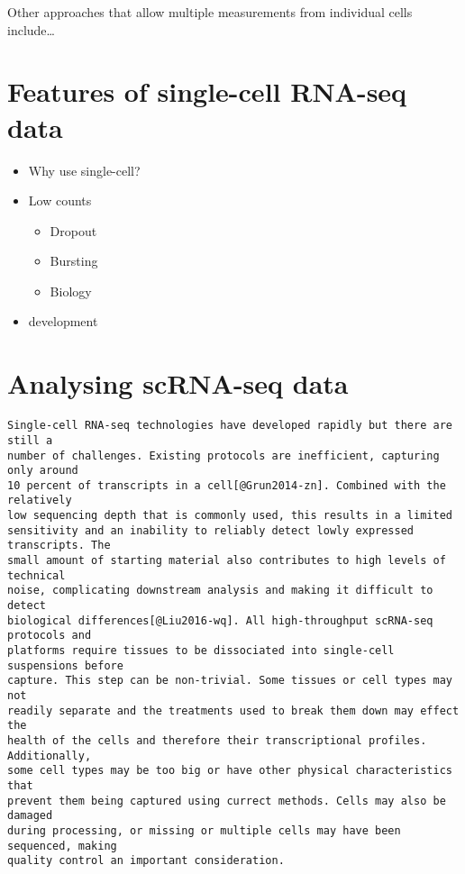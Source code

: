 \documentclass[11pt,a4paper,titlepage,twoside,openright]{style/unimelbthesis}
\theoremstyle{definition}
\theoremstyle{definition}
\theoremstyle{definition}
\theoremstyle{remark}
\begin{document}
\begin{mainmatter}
Other approaches that allow multiple measurements from individual cells include\ldots{}

\hypertarget{features-of-single-cell-rna-seq-data}{%
\section{Features of single-cell RNA-seq data}\label{features-of-single-cell-rna-seq-data}}

\begin{itemize}
\tightlist
\item
  Why use single-cell?
\item
  Low counts

  \begin{itemize}
  \tightlist
  \item
    Dropout
  \item
    Bursting
  \item
    Biology
  \end{itemize}
\item
  development
\end{itemize}

\hypertarget{analysing-scrna-seq-data}{%
\section{Analysing scRNA-seq data}\label{analysing-scrna-seq-data}}

\begin{verbatim}
Single-cell RNA-seq technologies have developed rapidly but there are still a
number of challenges. Existing protocols are inefficient, capturing only around
10 percent of transcripts in a cell[@Grun2014-zn]. Combined with the relatively
low sequencing depth that is commonly used, this results in a limited
sensitivity and an inability to reliably detect lowly expressed transcripts. The
small amount of starting material also contributes to high levels of technical
noise, complicating downstream analysis and making it difficult to detect
biological differences[@Liu2016-wq]. All high-throughput scRNA-seq protocols and
platforms require tissues to be dissociated into single-cell suspensions before
capture. This step can be non-trivial. Some tissues or cell types may not
readily separate and the treatments used to break them down may effect the
health of the cells and therefore their transcriptional profiles. Additionally,
some cell types may be too big or have other physical characteristics that
prevent them being captured using currect methods. Cells may also be damaged
during processing, or missing or multiple cells may have been sequenced, making
quality control an important consideration.


\end{verbatim}
\end{mainmatter}
\end{document}
